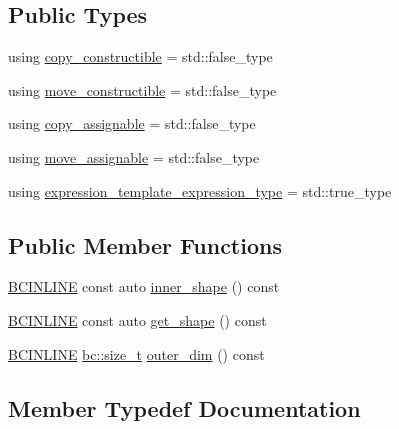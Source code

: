 \subsection*{Public Types}
\begin{DoxyCompactItemize}
\item 
using \hyperlink{structbc_1_1tensors_1_1exprs_1_1Expression__Base_a4e341022b3423c4310eda3891188cc30}{copy\+\_\+constructible} = std\+::false\+\_\+type
\item 
using \hyperlink{structbc_1_1tensors_1_1exprs_1_1Expression__Base_a9619522344f7a6c75d4a7aa04abb2464}{move\+\_\+constructible} = std\+::false\+\_\+type
\item 
using \hyperlink{structbc_1_1tensors_1_1exprs_1_1Expression__Base_ab1be0cb2dd12cb2f0b3686481e0395ff}{copy\+\_\+assignable} = std\+::false\+\_\+type
\item 
using \hyperlink{structbc_1_1tensors_1_1exprs_1_1Expression__Base_a2950540845a4338b7427f2414d825212}{move\+\_\+assignable} = std\+::false\+\_\+type
\item 
using \hyperlink{structbc_1_1tensors_1_1exprs_1_1Expression__Base_a3bd6a40f779c4054057f6de222e7148e}{expression\+\_\+template\+\_\+expression\+\_\+type} = std\+::true\+\_\+type
\end{DoxyCompactItemize}
\subsection*{Public Member Functions}
\begin{DoxyCompactItemize}
\item 
\hyperlink{common_8h_a6699e8b0449da5c0fafb878e59c1d4b1}{B\+C\+I\+N\+L\+I\+NE} const auto \hyperlink{structbc_1_1tensors_1_1exprs_1_1Expression__Base_a8680e24e460343891b21b8f2f39e3631}{inner\+\_\+shape} () const
\item 
\hyperlink{common_8h_a6699e8b0449da5c0fafb878e59c1d4b1}{B\+C\+I\+N\+L\+I\+NE} const auto \hyperlink{structbc_1_1tensors_1_1exprs_1_1Expression__Base_a318d8ac150ba7fa474747413d9b7e066}{get\+\_\+shape} () const
\item 
\hyperlink{common_8h_a6699e8b0449da5c0fafb878e59c1d4b1}{B\+C\+I\+N\+L\+I\+NE} \hyperlink{namespacebc_aaf8e3fbf99b04b1b57c4f80c6f55d3c5}{bc\+::size\+\_\+t} \hyperlink{structbc_1_1tensors_1_1exprs_1_1Expression__Base_a2b2142965f6912051f87956e00e0fd1a}{outer\+\_\+dim} () const
\end{DoxyCompactItemize}


\subsection{Member Typedef Documentation}
\mbox{\label{structbc_1_1tensors_1_1exprs_1_1Expression__Base_ab1be0cb2dd12cb2f0b3686481e0395ff}} 
